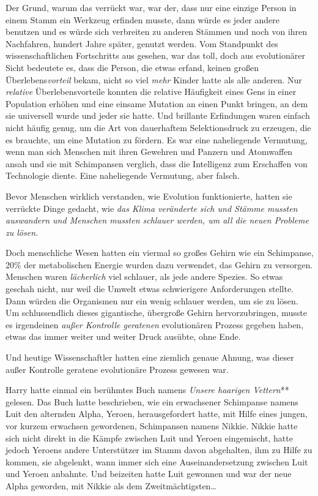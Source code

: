 {Der Grund, warum das verrückt war, war der, dass nur eine einzige Person in einem Stamm ein Werkzeug erfinden musste, dann würde es jeder andere benutzen und es würde sich verbreiten zu anderen Stämmen und noch von ihren Nachfahren, hundert Jahre später, genutzt werden. Vom Standpunkt des wissenschaftlichen Fortschritts aus gesehen, war das toll, doch aus evolutionärer Sicht bedeutete es, dass die Person, die etwas erfand, keinen großen Überlebens\emph{vorteil} bekam, nicht so viel \emph{mehr} Kinder hatte als alle anderen. Nur \emph{relative} Überlebensvorteile konnten die relative Häufigkeit eines Gens in einer Population erhöhen und eine einsame Mutation an einen Punkt bringen, an dem sie universell wurde und jeder sie hatte. Und brillante Erfindungen waren einfach nicht häufig genug, um die Art von dauerhaftem Selektionsdruck zu erzeugen, die es brauchte, um eine Mutation zu fördern. Es war eine naheliegende Vermutung, wenn man sich Menschen mit ihren Gewehren und Panzern und Atomwaffen ansah und sie mit Schimpansen verglich, dass die Intelligenz zum Erschaffen von Technologie diente. Eine naheliegende Vermutung, aber falsch.

Bevor Menschen wirklich verstanden, wie Evolution funktionierte, hatten sie verrückte Dinge gedacht, wie \emph{das Klima veränderte sich und Stämme mussten auswandern und Menschen mussten schlauer werden, um all die neuen Probleme zu lösen.}

Doch menschliche Wesen hatten ein viermal so großes Gehirn wie ein Schimpanse, 20\% der metabolischen Energie wurden dazu verwendet, das Gehirn zu versorgen. Menschen waren \emph{lächerlich} viel schlauer, als jede andere Spezies. So etwas geschah nicht, nur weil die Umwelt etwas schwierigere Anforderungen stellte. Dann würden die Organismen nur ein wenig schlauer werden, um sie zu lösen. Um schlussendlich dieses gigantische, übergroße Gehirn hervorzubringen, musste es irgendeinen \emph{außer Kontrolle geratenen} evolutionären Prozess gegeben haben, etwas das immer weiter und weiter Druck ausübte, ohne Ende.

Und heutige Wissenschaftler hatten eine ziemlich genaue Ahnung, was dieser außer Kontrolle geratene evolutionäre Prozess gewesen war.

Harry hatte einmal ein berühmtes Buch namens \emph{Unsere haarigen Vettern}** gelesen. Das Buch hatte beschrieben, wie ein erwachsener Schimpanse namens Luit den alternden Alpha, Yeroen, herausgefordert hatte, mit Hilfe eines jungen, vor kurzem erwachsen gewordenen, Schimpansen namens Nikkie. Nikkie hatte sich nicht direkt in die Kämpfe zwischen Luit und Yeroen eingemischt, hatte jedoch Yeroens andere Unterstützer im Stamm davon abgehalten, ihm zu Hilfe zu kommen, sie abgelenkt, wann immer sich eine Auseinandersetzung zwischen Luit und Yeroen anbahnte. Und beizeiten hatte Luit gewonnen und war der neue Alpha geworden, mit Nikkie als dem Zweitmächtigsten…

}
